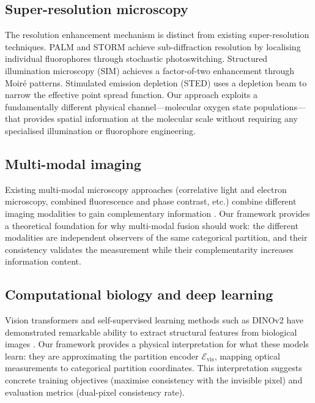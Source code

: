 \documentclass[11pt,twocolumn,a4paper]{article}
\begin{document}
\subsection{Super-resolution microscopy}

The resolution enhancement mechanism is distinct from existing super-resolution techniques.
PALM \citep{Betzig2006} and STORM \citep{Rust2006} achieve sub-diffraction resolution by localising individual fluorophores through stochastic photoswitching.
Structured illumination microscopy (SIM) \citep{Gustafsson2000} achieves a factor-of-two enhancement through Moir\'e patterns.
Stimulated emission depletion (STED) \citep{Hell1994} uses a depletion beam to narrow the effective point spread function.
Our approach exploits a fundamentally different physical channel---molecular oxygen state populations---that provides spatial information at the molecular scale without requiring any specialised illumination or fluorophore engineering.

\subsection{Multi-modal imaging}

Existing multi-modal microscopy approaches (correlative light and electron microscopy, combined fluorescence and phase contrast, etc.) combine different imaging modalities to gain complementary information \citep{deBruin2015}.
Our framework provides a theoretical foundation for why multi-modal fusion should work: the different modalities are independent observers of the same categorical partition, and their consistency validates the measurement while their complementarity increases information content.

\subsection{Computational biology and deep learning}

Vision transformers \citep{Dosovitskiy2021} and self-supervised learning methods such as DINOv2 \citep{Oquab2024} have demonstrated remarkable ability to extract structural features from biological images \citep{Caron2021}.
Our framework provides a physical interpretation for what these models learn: they are approximating the partition encoder $\mathcal{E}_{\mathrm{vis}}$, mapping optical measurements to categorical partition coordinates.
This interpretation suggests concrete training objectives (maximise consistency with the invisible pixel) and evaluation metrics (dual-pixel consistency rate).
\end{document}
